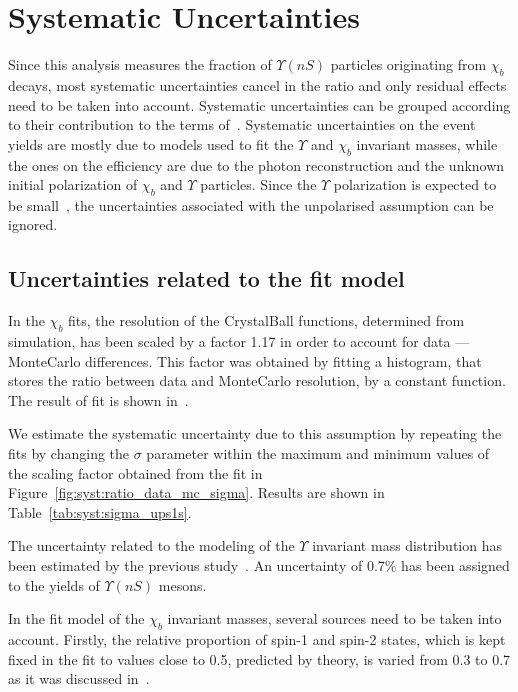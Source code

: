\section[Systematic]{Systematic Uncertainties}
\label{sec:syst}

Since this analysis measures the fraction of $\Upsilon(nS)$ particles
originating from $\chi_b$ decays, most systematic uncertainties cancel in the
ratio and only residual effects need to be taken into account. Systematic
uncertainties can be grouped according to their contribution to the terms
of~. Systematic uncertainties on the event yields are mostly
due to models used to fit the $\Upsilon$ and $\chi_b$ invariant masses, while
the ones on the efficiency are due to the photon reconstruction and the unknown
initial polarization of $\chi_b$ and $\Upsilon$ particles. Since the $\Upsilon$
polarization is expected to be small~\cite{Aaij:2013yaa,Aaij:2014nwa}, the
uncertainties associated with the unpolarised assumption can be ignored. 
 

\subsection{Uncertainties related to the fit model}

In the $\chi_b$ fits, the resolution of the CrystalBall functions, determined
from simulation, has been scaled by a factor 1.17 in order to account for data
--- MonteCarlo differences. This factor was obtained by fitting a histogram,
that stores the ratio between data and MonteCarlo resolution, by a constant
function. The result of fit is shown in~.
 
% 


We estimate the systematic uncertainty due to this assumption by repeating the
fits by changing the $\sigma$ parameter within the maximum and minimum values of
the scaling factor obtained from the fit in Figure~\ref{fig:syst:ratio_data_mc_sigma}.
Results are shown in Table~\ref{tab:syst:sigma_ups1s}.


The uncertainty related to the modeling of the $\Upsilon$ invariant mass
distribution has been estimated by the previous
study~\cite{Aaij:2013yaa}. An uncertainty of 0.7\% has been assigned to the
yields of $\Upsilon(nS)$ mesons.

In the fit model of the $\chi_b$ invariant masses, several sources need to be
taken into account. Firstly, the relative proportion of spin-1 and spin-2
states, which is kept fixed in the fit to values close to 0.5, predicted by
theory, is varied from 0.3 to 0.7 as it was discussed in~.


